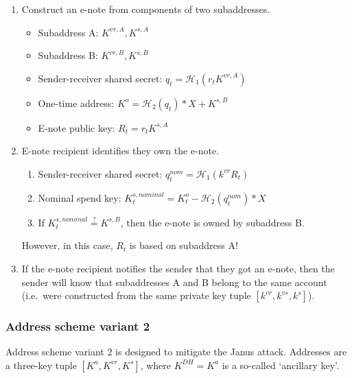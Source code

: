\begin{enumerate}
    \item Construct an e-note from components of two subaddresses.
    \begin{itemize}
        \item Subaddress A: $K^{vr,A}, K^{s,A}$
        \item Subaddress B: $K^{vr,B}, K^{s,B}$
        \item Sender-receiver shared secret: $q_t = \mathcal{H}_1(r_t K^{vr,A})$
        \item One-time address: $K^o = \mathcal{H}_2(q_t)*X + K^{s,B}$
        \item E-note public key: $R_t = r_t K^{s,A}$
    \end{itemize}

    \item E-note recipient identifies they own the e-note.
    \begin{enumerate}
        \item Sender-receiver shared secret: $q^{nom}_t = \mathcal{H}_1(k^{vr} R_t)$
        \item Nominal spend key: $K^{s,nominal}_t = K^o_t - \mathcal{H}_2(q^{nom}_t)*X$
        \item If $K^{s,nominal}_t \stackrel{?}{=} K^{s,B}$, then the e-note is owned by subaddress B.
    \end{enumerate}
    
    However, in this case, $R_t$ is based on subaddress A!

    \item If the e-note recipient notifies the sender that they got an e-note, then the sender will know that subaddresses A and B belong to the same account (i.e.\ were constructed from the same private key tuple $[k^{vr}, k^{vs}, k^s]$).
\end{enumerate}

\subsubsection{Address scheme variant 2}

Address scheme variant 2 is designed to mitigate the Janus attack. Addresses are a three-key tuple $[K^a, K^{vr}, K^s]$, where $K^{DH} = K^a$ is a so-called `ancillary key'.

